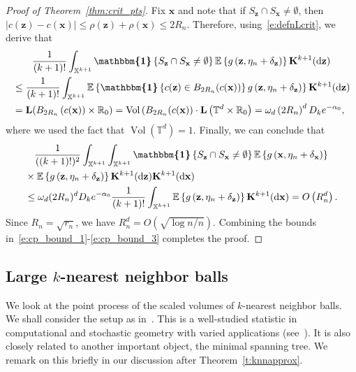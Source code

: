 \documentclass[AHL,Unicode,longabstracts]{cedram}
\DeclareMathOperator{\vol}{Vol}
\newcommand*\bL{\mathbf{L}}
\newcommand*\bK{\mathbf{K}}
\newcommand{\bz}{\mathbf{z}}
\newcommand{\bx}{\mathbf{x}}
\newcommand*\R{\mathbb{R}}
\newcommand*\T{\mathbb{T}}
\newcommand*\X{\mathbb{X}}
\newcommand{\E}{\mathbb{E}}
\newcommand*\md{\mathrm{d}}
\newcommand{\mean}[1] {\E\left\{{#1}\right\}}
\newcommand{\ind}{\boldsymbol{\mathbbm{1}}}
\newcommand{\set}[1]{\left\{#1\right\}}
\begin{document}
\begin{proof}[Proof of Theorem~\ref{thm:crit_pts}]
Fix $\bx$ and note that if $S_{\bz} \cap S_{\bx} \ne \emptyset$, then $|c(\bz)-c(\bx)| \le \rho(\bz)+\rho(\bx) \le 2R_n$. Therefore, using~\eqref{e:defnLcrit}, we derive that
\begin{multline*}
\frac{1}{(k+1)!}\int_{\X^{k+1}}\ind\set{S_{\bz}\cap S_{\bx}\ne \emptyset} \mean{g\left(\bz,\eta_n+\delta_{\bz}\right)} \bK^{k+1}(\md\bz)\\
\begin{aligned}
&\le \frac{1}{(k+1)!}\int_{\X^{k+1}}
\mean{\ind\set{c(\bz)\in B_{2R_n}(c(\bx))}g\left(\bz,\eta_n+\delta_{\bz}\right)} \bK^{k+1}(\md\bz)\\
&= \bL(B_{2R_n}\left(c(\bx))\times \R_0\right) = \vol\left(B_{2R_n}(c(\bx)\right) \cdot \bL\left(\T^d\times\R_0\right) = \omega_d \left(2R_n\right)^d D_k e^{-\alpha_0},
\end{aligned}
\end{multline*}
where we used the fact that $\vol(\T^d) = 1$. Finally, we can conclude that
\begin{multline}\label{e:cp_bound_3}
\frac{1}{((k+1)!)^2}\int_{\X^{k+1}} \int_{\X^{k+1}}\ind\set{S_{\bz}\cap S_{\bx}\ne \emptyset} \mean{g\left(\bx,\eta_n+\delta_{\bx}\right)} \\
\begin{aligned}
&\times\mean{g\left(\bz,\eta_n+\delta_{\bz}\right)} \bK^{k+1}(\md\bz) \bK^{k+1}(\md\bx) \\
&\le \omega_d (2R_n)^d D_k e^{-\alpha_0} \frac{1}{(k+1)!}\int_{\X^{k+1}} \mean{g\left(\bz,\eta_n+\delta_{\bz}\right)}\bK^{k+1}(\md\bx) = O\left(R_n^d\right).
\end{aligned}
\end{multline}
Since $R_n = \sqrt{r_n}$, we have $R_n^d = O(\sqrt{\log n/n})$. Combining the bounds in~\eqref{e:cp_bound_1}-\eqref{e:cp_bound_3} completes the proof.
\end{proof}

\subsection{Large \texorpdfstring{$k$}{k}-nearest neighbor balls}\label{s:knn}
We look at the point process of the scaled volumes of $k$-nearest neighbor balls. We shall consider the setup as in~\cite[Section~4]{Otto2020}. This is a well-studied statistic in computational and stochastic geometry with varied applications (see~\cite[Pg.~342]{Penrose1997}). It is also closely related to another important object, the minimal spanning tree. We remark on this briefly in our discussion after Theorem~\ref{t:knnapprox}.
\end{document}

